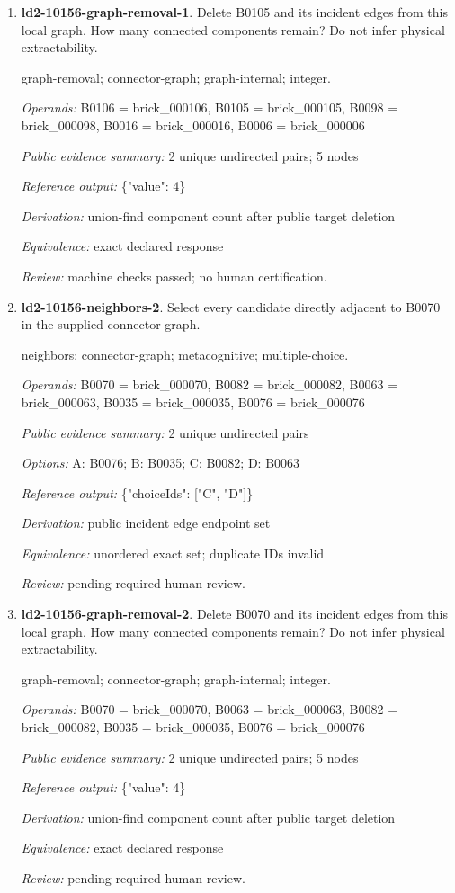 \begin{enumerate}
\item \textbf{ld2-10156-graph-removal-1}. Delete B0105 and its incident edges from this local graph. How many connected components remain? Do not infer physical extractability.
\par{\small graph-removal; connector-graph; graph-internal; integer.\par\textit{Operands:} B0106 = brick\_000106, B0105 = brick\_000105, B0098 = brick\_000098, B0016 = brick\_000016, B0006 = brick\_000006\par\textit{Public evidence summary:} 2 unique undirected pairs; 5 nodes\par\textit{Reference output:} \{"value": 4\}\par\textit{Derivation:} union-find component count after public target deletion\par\textit{Equivalence:} exact declared response\par\textit{Review:} machine checks passed; no human certification.}
\item \textbf{ld2-10156-neighbors-2}. Select every candidate directly adjacent to B0070 in the supplied connector graph.
\par{\small neighbors; connector-graph; metacognitive; multiple-choice.\par\textit{Operands:} B0070 = brick\_000070, B0082 = brick\_000082, B0063 = brick\_000063, B0035 = brick\_000035, B0076 = brick\_000076\par\textit{Public evidence summary:} 2 unique undirected pairs\par\textit{Options:} A: B0076; B: B0035; C: B0082; D: B0063\par\textit{Reference output:} \{"choiceIds": ["C", "D"]\}\par\textit{Derivation:} public incident edge endpoint set\par\textit{Equivalence:} unordered exact set; duplicate IDs invalid\par\textit{Review:} pending required human review.}
\item \textbf{ld2-10156-graph-removal-2}. Delete B0070 and its incident edges from this local graph. How many connected components remain? Do not infer physical extractability.
\par{\small graph-removal; connector-graph; graph-internal; integer.\par\textit{Operands:} B0070 = brick\_000070, B0063 = brick\_000063, B0082 = brick\_000082, B0035 = brick\_000035, B0076 = brick\_000076\par\textit{Public evidence summary:} 2 unique undirected pairs; 5 nodes\par\textit{Reference output:} \{"value": 4\}\par\textit{Derivation:} union-find component count after public target deletion\par\textit{Equivalence:} exact declared response\par\textit{Review:} pending required human review.}

\end{enumerate}

